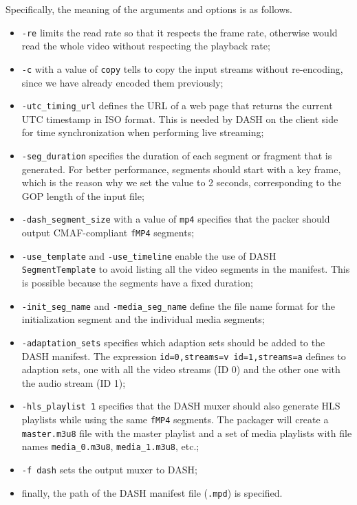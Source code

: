 Specifically, the meaning of the arguments and options is as follows.

\begin{itemize}
    \item \texttt{-re} limits the read rate so that it respects the frame rate, otherwise \ffmpeg{} would read the whole video without respecting the playback rate;
    \item \texttt{-c} with a value of \texttt{copy} tells \ffmpeg{} to copy the input streams without re-encoding, since we have already encoded them previously;
    \item \texttt{-utc\_timing\_url} defines the URL of a web page that returns the current UTC timestamp in ISO format. This is needed by DASH on the client side for time synchronization when performing live streaming;
    \item \texttt{-seg\_duration} specifies the duration of each segment or fragment that is generated. For better performance, segments should start with a key frame, which is the reason why we set the value to 2 seconds, corresponding to the GOP length of the input file;
    \item \texttt{-dash\_segment\_size} with a value of \texttt{mp4} specifies that the packer should output CMAF-compliant \texttt{fMP4} segments;
    \item \texttt{-use\_template} and \texttt{-use\_timeline} enable the use of DASH \texttt{SegmentTemplate} to avoid listing all the video segments in the manifest. This is possible because the segments have a fixed duration;
    \item \texttt{-init\_seg\_name} and \texttt{-media\_seg\_name} define the file name format for the initialization segment and the individual media segments;
    \item \texttt{-adaptation\_sets} specifies which adaption sets should be added to the DASH manifest. The expression \texttt{id=0,streams=v id=1,streams=a} defines to adaption sets, one with all the video streams (ID 0) and the other one 
    with the audio stream (ID 1);
    \item \texttt{-hls\_playlist 1} specifies that the DASH muxer should also generate HLS playlists while using the same \texttt{fMP4} segments. The packager will create a \texttt{master.m3u8} file with the master playlist and a set of media playlists with file names \texttt{media\_0.m3u8}, \texttt{media\_1.m3u8}, etc.;
    \item \texttt{-f dash} sets the \ffmpeg{} output muxer to DASH;
    \item finally, the path of the DASH manifest file (\texttt{.mpd}) is specified.
\end{itemize}

